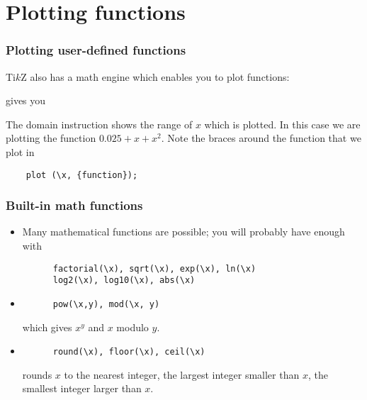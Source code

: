 %
%
\section{
  Plotting functions
}
%
%
\begin{frame}[fragile]
  \frametitle{
    Plotting user-defined functions
  }

  Ti$k$Z also has a math engine which enables you to plot functions:

  

  gives you

  \begin{center}
    
  \end{center}

  The domain instruction shows the range of $x$ which is plotted. In this case we are plotting the function $0.025+x+x^2.$ Note the braces around the function that we plot in

  \begin{lstlisting}
    plot (\x, {function});
  \end{lstlisting}
  
\end{frame}

%
%
\begin{frame}[fragile]
  \frametitle{
    Built-in math functions
}

  \begin{itemize}
  \item
    Many mathematical functions are possible; you will probably have enough with

    \begin{lstlisting}
      factorial(\x), sqrt(\x), exp(\x), ln(\x)
      log2(\x), log10(\x), abs(\x)
    \end{lstlisting}

  \item
    
    \begin{lstlisting}
      pow(\x,y), mod(\x, y)
    \end{lstlisting}

    which gives $x^y$ and $x$ modulo $y.$

  \item
    
    \begin{lstlisting}
      round(\x), floor(\x), ceil(\x)
    \end{lstlisting}
       
    rounds $x$ to the nearest integer, the largest integer smaller than $x$, the smallest integer larger than $x$.
  \end{itemize}
\end{frame}


